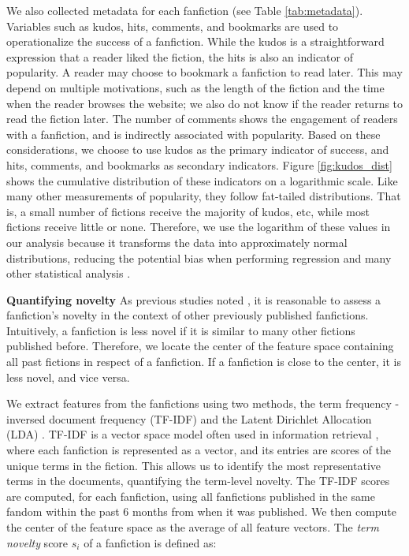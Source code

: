 \documentclass[letterpaper]{article} %
\begin{document}
We also collected metadata for each fanfiction (see Table \ref{tab:metadata}). Variables such as kudos, hits, comments, and bookmarks are used to operationalize the success of a fanfiction. While the kudos is a straightforward expression that a reader liked the fiction, the hits is also an indicator of popularity. A reader may choose to bookmark a fanfiction to read later. This may depend on multiple motivations, such as the length of the fiction and the time when the reader browses the website; we also do not know if the reader returns to read the fiction later. The number of comments shows the engagement of readers with a fanfiction, and is indirectly associated with popularity. Based on these considerations, we choose to use kudos as the primary indicator of success, and hits, comments, and bookmarks as secondary indicators. Figure \ref{fig:kudos_dist} shows the cumulative distribution of these indicators on a logarithmic scale. Like many other measurements of popularity, they follow fat-tailed distributions. That is, a small number of fictions receive the majority of kudos, etc, while most fictions receive little or none. Therefore, we use the logarithm of these values in our analysis because it transforms the data into approximately normal distributions, reducing the potential bias when performing regression and many other statistical analysis \cite{thelwall2014regression}. 

\textbf{Quantifying novelty}   As previous studies noted \cite{askin2017makes} \cite{de2015game}, it is reasonable to assess a fanfiction's novelty in the context of other previously published fanfictions. Intuitively, a fanfiction is less novel if it is similar to many other fictions published before. Therefore, we locate the center of the feature space containing all past fictions in respect of a fanfiction. If a fanfiction is close to the center, it is less novel, and vice versa.

We extract features from the fanfictions using two methods, the term frequency - inversed document frequency (TF-IDF) and the Latent Dirichlet Allocation (LDA) \cite{blei2003latent}. TF-IDF is a vector space model often used in information retrieval \cite{turney2010frequency}, where each fanfiction is represented as a vector, and its entries are scores of the unique terms in the fiction. This allows us to identify the most representative terms in the documents, quantifying the term-level novelty. The TF-IDF scores are computed, for each fanfiction, using all fanfictions published in the same fandom within the past 6 months from when it was published. We then compute the center of the feature space as the average of all feature vectors. The \emph{term novelty} score $s_i$ of a fanfiction is defined as:
\end{document}
